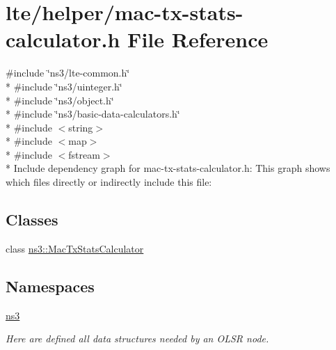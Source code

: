 \hypertarget{mac-tx-stats-calculator_8h}{}\section{lte/helper/mac-\/tx-\/stats-\/calculator.h File Reference}
\label{mac-tx-stats-calculator_8h}
{\ttfamily \#include \char`\"{}ns3/lte-\/common.\+h\char`\"{}}\\*
{\ttfamily \#include \char`\"{}ns3/uinteger.\+h\char`\"{}}\\*
{\ttfamily \#include \char`\"{}ns3/object.\+h\char`\"{}}\\*
{\ttfamily \#include \char`\"{}ns3/basic-\/data-\/calculators.\+h\char`\"{}}\\*
{\ttfamily \#include $<$string$>$}\\*
{\ttfamily \#include $<$map$>$}\\*
{\ttfamily \#include $<$fstream$>$}\\*
Include dependency graph for mac-\/tx-\/stats-\/calculator.h\+:
This graph shows which files directly or indirectly include this file\+:
\subsection*{Classes}
\begin{DoxyCompactItemize}
\item 
class \hyperlink{classns3_1_1MacTxStatsCalculator}{ns3\+::\+Mac\+Tx\+Stats\+Calculator}
\end{DoxyCompactItemize}
\subsection*{Namespaces}
\begin{DoxyCompactItemize}
\item 
 \hyperlink{namespacens3}{ns3}
\begin{DoxyCompactList}\small\item\em Here are defined all data structures needed by an O\+L\+SR node. \end{DoxyCompactList}\end{DoxyCompactItemize}
